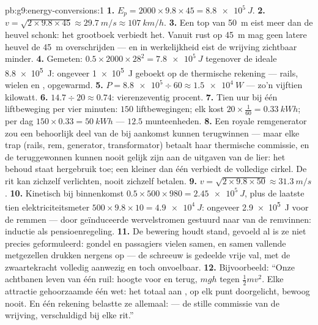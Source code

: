 \begin{solution}{pb:g9:energy-conversions:1}
\textbf{1.} $E_p = 2000 \times 9.8 \times 45 = \qty{8.8e5}{J}$.
\textbf{2.} $v = \sqrt{2 \times 9.8 \times 45} \approx \qty{29.7}{m/s}
\approx \qty{107}{km/h}$.
\textbf{3.} Een top van \qty{50}{m} eist meer  dan de
heuvel schonk: het grootboek verbiedt het. Vanuit rust op \qty{45}{m}
mag geen latere heuvel de \qty{45}{m} overschrijden --- en in
werkelijkheid eist de wrijving zichtbaar minder.
\textbf{4.} Gemeten: $0.5 \times 2000 \times 28^2 = \qty{7.8e5}{J}$
tegenover de ideale \qty{8.8e5}{J}: ongeveer \qty{1e5}{J} geboekt op de
thermische rekening --- rails, wielen en , opgewarmd.
\textbf{5.} $P = \num{8.8e5} \div 60 \approx \qty{1.5e4}{W}$ --- zo'n
vijftien kilowatt.
\textbf{6.} $14.7 \div 20 \approx 0.74$: vierenzeventig procent.
\textbf{7.} Tien uur bij één liftbeweging per vier minuten: $150$
liftbewegingen; elk kost $20 \times \tfrac{1}{60} = \qty{0.33}{kWh}$;
per dag $150 \times 0.33 = \qty{50}{kWh}$ --- $12.5$
munteenheden.
\textbf{8.} Een royale remgenerator zou een behoorlijk deel van de
 bij aankomst kunnen terugwinnen --- maar elke
trap (rails, rem, generator, transformator) betaalt haar thermische
commissie, en de teruggewonnen  kunnen nooit gelijk zijn
aan de uitgaven van de lier: het behoud staat hergebruik toe; een
 kleiner dan één verbiedt de volledige cirkel. De rit kan
zichzelf verlichten, nooit zichzelf betalen.
\textbf{9.} $v = \sqrt{2 \times 9.8 \times 50} \approx \qty{31.3}{m/s}$.
\textbf{10.} Kinetisch bij binnenkomst $0.5 \times 500 \times 980 =
\qty{2.45e5}{J}$, plus de laatste tien elektriciteitsmeter $500 \times 9.8
\times 10 = \qty{4.9e4}{J}$: ongeveer \qty{2.9e5}{J} voor de remmen ---
door geïnduceerde wervelstromen gestuurd naar  van de
remvinnen: inductie als pensioenregeling.
\textbf{11.} De bewering houdt stand, gevoeld al is ze niet precies
geformuleerd: gondel en passagiers vielen samen, en samen vallende
metgezellen drukken nergens op --- de schreeuw is gedeelde vrije val,
met de zwaartekracht volledig aanwezig en toch onvoelbaar.
\textbf{12.} Bijvoorbeeld: ``Onze achtbanen leven van één ruil: hoogte
voor  en terug, $m g h$ tegen $\frac12 m v^2$. Elke
attractie gehoorzaamde één wet: het totaal aan , op elk
punt doorgelicht, bewoog nooit. En één rekening belastte ze allemaal:
 --- de stille commissie van de wrijving, verschuldigd bij elke
rit.''
\end{solution}
